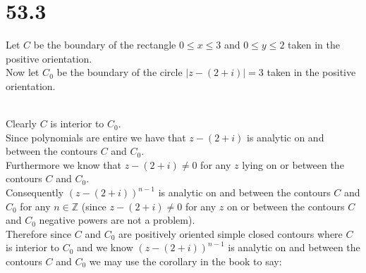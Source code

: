 \documentclass{article}
\begin{document}
\newpage
\section*{53.3}
\begin{center}
    \doublespacing
    Let $C$ be the boundary of the rectangle $0\leq x\leq 3$ and $0\leq y\leq 2$ taken in the positive orientation.
    \\Now let $C_0$ be the boundary of the circle $|z - (2 + i)| = 3$ taken in the positive orientation.
    \\Clearly $C$ is interior to $C_0$.
    \\Since polynomials are entire we have that $z - (2 + i)$ is analytic on and between the contours $C$ and $C_0$.
    \\Furthermore we know that $z - (2 + i)\neq 0$ for any $z$ lying on or between the contours $C$ and $C_0$.
    \\Consequently $(z - (2 + i))^{n-1}$ is analytic on and between the contours $C$ and $C_0$ for any $n\in\mathbb{Z}$ (since $z - (2 + i)\neq 0$ for any $z$ on or between the contours $C$ and $C_0$ negative powers are not a problem).
    \\Therefore since $C$ and $C_0$ are positively oriented simple closed contours where $C$ is interior to $C_0$ and we know $(z - (2 + i))^{n-1}$ is analytic on and between the contours $C$ and $C_0$ we may use the corollary in the book to say:

\end{center}
\end{document}
